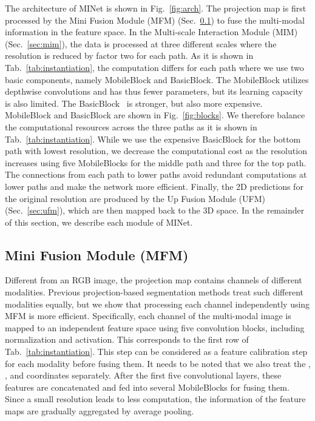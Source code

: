 \documentclass[letterpaper, 10 pt, journal, twoside]{ieeetran}
\newcommand{\figref}[1]{Fig.~\ref{#1}}
\newcommand{\tabref}[1]{Tab.~\ref{#1}}
\newcommand{\secref}[1]{Sec.~\ref{#1}}
\begin{document}
The architecture of MINet is shown in \figref{fig:arch}. The projection map is first processed by the Mini Fusion Module (MFM) (\secref{sec:mfm}) to fuse the multi-modal information in the feature space. 
In the Multi-scale Interaction Module (MIM) (\secref{sec:mim}), the data is processed at three different scales where the resolution is reduced by factor two for each path. 
As it is shown in \tabref{tab:instantiation}, the computation differs for each path where we use two basic components, namely MobileBlock and BasicBlock. 
The MobileBlock \cite{howard2017mobilenets, sandler2018mobilenetv2} utilizes depthwise convolutions and has thus fewer parameters, but its learning capacity is also limited. 
The BasicBlock~\cite{he2016deep} is stronger, but also more expensive. 
MobileBlock and BasicBlock are shown in \figref{fig:blocks}. 
We therefore balance the computational resources across the three paths as it is shown in \tabref{tab:instantiation}. 
While we use the expensive BasicBlock for the bottom path with lowest resolution, we decrease the computational cost as the resolution increases using five MobileBlocks for the middle path and three for the top path. 
The connections from each path to lower paths avoid redundant computations at lower paths and make the network more efficient. 
Finally, the 2D predictions for the original resolution are produced by the Up Fusion Module (UFM) (\secref{sec:ufm}), which are then mapped back to the 3D space. 
In the remainder of this section, we describe each module of MINet.


\subsection{Mini Fusion Module (MFM)} \label{sec:mfm}
Different from an RGB image, the projection map contains channels of different modalities. 
Previous projection-based segmentation methods \cite{wu2018squeezeseg,wu2019squeezesegv2,milioto2019rangenet++} treat such different modalities equally, but we show that processing each channel independently using MFM is more efficient.
Specifically, each channel of the multi-modal image is mapped to an independent feature space using five convolution blocks, including normalization and activation. 
This corresponds to the first row of \tabref{tab:instantiation}. 
This step can be considered as a feature calibration step for each modality before fusing them. 
It needs to be noted that we also treat the , , and  coordinates separately. 
After the first five convolutional layers, these features are concatenated and fed into several MobileBlocks for fusing them. 
Since a small resolution leads to less computation, the information of the feature maps are gradually aggregated by average pooling.
\end{document}
